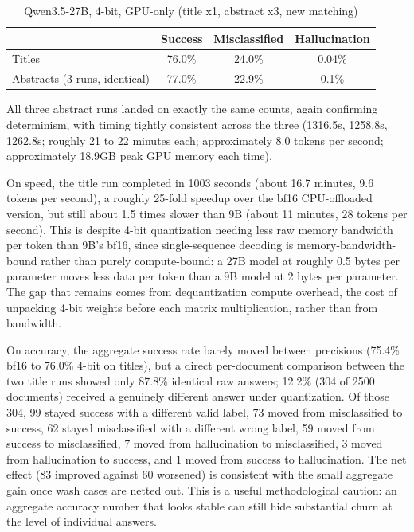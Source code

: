 \begin{table}[h]
\centering
\caption{Qwen3.5-27B, 4-bit, GPU-only (title x1, abstract x3, new matching)}
\label{tab:qwen35-27b-4bit}
\begin{tabular}{lccc}
\toprule
 & Success & Misclassified & Hallucination \\
\midrule
Titles & 76.0\% & 24.0\% & 0.04\% \\
Abstracts (3 runs, identical) & 77.0\% & 22.9\% & 0.1\% \\
\bottomrule
\end{tabular}
\end{table}

All three abstract runs landed on exactly the same counts, again confirming determinism, with timing tightly consistent across the three (1316.5s, 1258.8s, 1262.8s; roughly 21 to 22 minutes each; approximately 8.0 tokens per second; approximately 18.9GB peak GPU memory each time).

On speed, the title run completed in 1003 seconds (about 16.7 minutes, 9.6 tokens per second), a roughly 25-fold speedup over the bf16 CPU-offloaded version, but still about 1.5 times slower than 9B (about 11 minutes, 28 tokens per second). This is despite 4-bit quantization needing less raw memory bandwidth per token than 9B's bf16, since single-sequence decoding is memory-bandwidth-bound rather than purely compute-bound: a 27B model at roughly 0.5 bytes per parameter moves less data per token than a 9B model at 2 bytes per parameter. The gap that remains comes from dequantization compute overhead, the cost of unpacking 4-bit weights before each matrix multiplication, rather than from bandwidth.

On accuracy, the aggregate success rate barely moved between precisions (75.4\% bf16 to 76.0\% 4-bit on titles), but a direct per-document comparison between the two title runs showed only 87.8\% identical raw answers; 12.2\% (304 of 2500 documents) received a genuinely different answer under quantization. Of those 304, 99 stayed success with a different valid label, 73 moved from misclassified to success, 62 stayed misclassified with a different wrong label, 59 moved from success to misclassified, 7 moved from hallucination to misclassified, 3 moved from hallucination to success, and 1 moved from success to hallucination. The net effect (83 improved against 60 worsened) is consistent with the small aggregate gain once wash cases are netted out. This is a useful methodological caution: an aggregate accuracy number that looks stable can still hide substantial churn at the level of individual answers.

